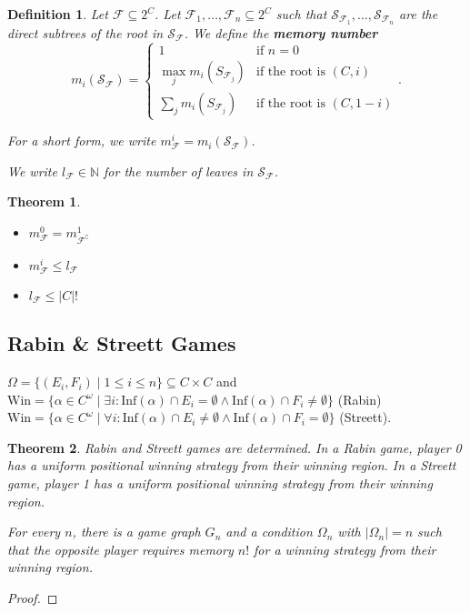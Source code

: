 \documentclass{article}
\newtheorem{theorem}{Theorem}
\newtheorem{definition}{Definition}
\begin{document}
\begin{definition}
	Let $\mathcal{F} \subseteq 2^C$. Let $\mathcal{F}_1, \dots, \mathcal{F}_n \subseteq 2^C$ such that $\mathcal{S}_{\mathcal{F}_1}, \dots, \mathcal{S}_{\mathcal{F}_n}$ are the direct subtrees of the root in $\mathcal{S}_\mathcal{F}$. We define the \textbf{memory number} 
	$$m_i(\mathcal{S}_\mathcal{F}) = \begin{cases}
		1 & \text{if } n = 0 \\
		\max_j m_i(S_{\mathcal{F}_j}) & \text{if the root is } (C, i) \\
		\sum_j m_i(S_{\mathcal{F}_j}) & \text{if the root is } (C, 1-i) 
	\end{cases}.$$
	
	For a short form, we write $m^i_\mathcal{F} = m_i(\mathcal{S}_\mathcal{F})$.
	
	We write $l_\mathcal{F} \in \mathbb{N}$ for the number of leaves in $\mathcal{S}_\mathcal{F}$.
\end{definition}

\begin{theorem}
\begin{itemize}
	\item $m^0_\mathcal{F} = m^1_{\mathcal{F}^\complement}$
	\item $m^i_\mathcal{F} \leq l_\mathcal{F}$
	\item $l_\mathcal{F} \leq |C|!$
\end{itemize}
\end{theorem}

\subsection{Rabin \& Streett Games}
$\Omega = \{(E_i, F_i) \mid 1 \leq i \leq n\} \subseteq C \times C$ and \\
$\text{Win} = \{ \alpha \in C^\omega \mid \exists i: \text{Inf}(\alpha) \cap E_i = \emptyset \land \text{Inf}(\alpha) \cap F_i \neq \emptyset \}$ (Rabin) \\
$\text{Win} = \{ \alpha \in C^\omega \mid \forall i: \text{Inf}(\alpha) \cap E_i \neq \emptyset \land \text{Inf}(\alpha) \cap F_i = \emptyset \}$ (Streett).

\begin{theorem}
	Rabin and Streett games are determined. In a Rabin game, player 0 has a uniform positional winning strategy from their winning region. In a Streett game, player 1 has a uniform positional winning strategy from their winning region. 
	
	For every $n$, there is a game graph $G_n$ and a condition $\Omega_n$ with $|\Omega_n| = n$ such that the opposite player requires memory $n!$ for a winning strategy from their winning region.
\end{theorem}
\begin{proof}
\end{proof}
\end{document}
